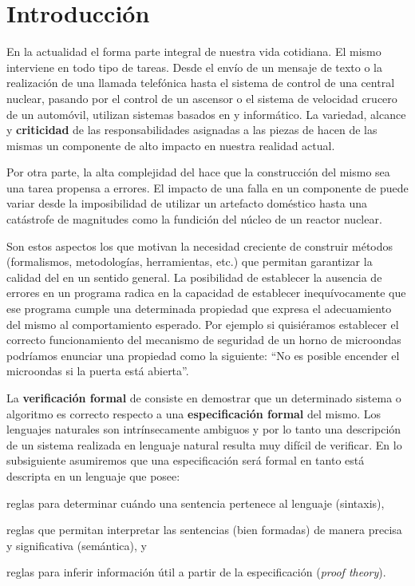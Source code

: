 
\chapter{Introducción} 
\label{intro}

En la actualidad el \soft forma parte integral de nuestra vida cotidiana. El
mismo interviene en todo tipo de tareas. Desde el envío de un mensaje de texto
o la realización de una llamada telefónica hasta el sistema de control de una
central nuclear, pasando por el control de un ascensor o el sistema de
velocidad crucero de un automóvil, utilizan sistemas basados en \hard y \soft
informático. La variedad, alcance y \textbf{criticidad} de las
responsabilidades asignadas a las piezas de \soft hacen de las mismas un
componente de alto impacto en nuestra realidad actual.

Por otra parte, la alta complejidad del \soft hace que la construcción del
mismo sea una tarea propensa a errores. El impacto de una falla en un
componente de \soft puede variar desde la imposibilidad de utilizar un
artefacto doméstico hasta una catástrofe de magnitudes como la fundición del
núcleo de un reactor nuclear.

Son estos aspectos los que motivan la necesidad creciente de construir métodos
(formalismos, metodologías, herramientas, etc.) que permitan garantizar la
calidad del \soft en un sentido general. La posibilidad de establecer la
ausencia de errores en un programa radica en la capacidad de establecer
inequívocamente que ese programa cumple una determinada propiedad que expresa
el adecuamiento del mismo al comportamiento esperado. Por ejemplo si
quisiéramos establecer el correcto  funcionamiento del mecanismo de seguridad
de un horno de microondas podríamos enunciar una propiedad como la siguiente:
``No es posible encender el microondas si la puerta está abierta''.

La \textbf{verificación formal} de \soft consiste en demostrar que un
determinado sistema o algoritmo es correcto respecto a una
\textbf{especificación formal} del mismo. Los lenguajes naturales son
intrínsecamente ambiguos y por lo tanto una descripción de un sistema
realizada en lenguaje natural resulta muy difícil de verificar. En lo
subsiguiente asumiremos que una especificación será formal en tanto está
descripta en un lenguaje que posee:  \begin{inparaenum}[a)]  \item reglas para
determinar cuándo una sentencia pertenece al lenguaje (sintaxis),  \item
reglas que permitan interpretar las sentencias (bien formadas) de manera
precisa y significativa (semántica), y  \item reglas para inferir información
útil a partir de la especificación (\emph{proof theory}).  \end{inparaenum}

